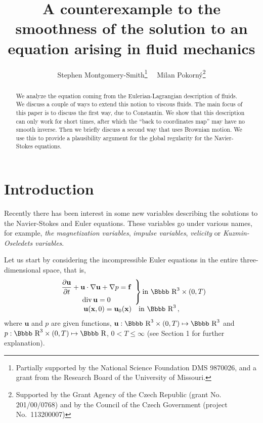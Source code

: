 \documentclass[12pt,twoside]{article}
\renewcommand {\div}{{\rm div}\,}
\newcommand {\rdd}{\mbox{\Bbbb R}}
\newcommand {\bu}{{\mathbf{u}}}
\newcommand {\bff}{{\mathbf{f}}}
\newcommand {\bx}{{\mathbf{x}}}
\newcommand {\pder}[2]{\frac {\partial #1}{\partial #2}}
\begin{document}
\title{A counterexample to the smoothness of the solution to an equation
arising in fluid mechanics 
}

\author {Stephen Montgomery-Smith\thanks{Partially supported by 
the National Science Foundation DMS 9870026, and a grant from the
Research Board of the University of Missouri.}
 \ \ Milan Pokorn\'y\thanks{Supported by the Grant Agency of the 
Czech Republic (grant
No. 201/00/0768) and by the Council of the Czech Government
(project No.~113200007)}
\date{}
}
\maketitle

\begin{abstract}
We analyze the equation coming from the Eulerian-Lagrangian description
of fluids.  We discuss a couple of ways to extend this notion to 
viscous fluids.  The main focus of this paper is to discuss 
the first way, due to Constantin.  We show that this description
can only work for short times, after which the ``back to coordinates map''
may have no smooth inverse.  Then we briefly discuss a second way that
uses Brownian motion.  We use this to provide a plausibility argument
for the global regularity for the Navier-Stokes equations.
\end{abstract}

\section{Introduction}

Recently there has been interest in some new variables describing 
the solutions to the Navier-Stokes and Euler equations.  These variables
go under various names, for example, {\em the magnetization variables},
{\em 
impulse variables}, {\em velicity} or {\em Kuzmin-Oseledets variables}.


Let us start by considering the incompressible Euler equations in the entire 
three-dimensional space, that is,
\begin{equation} \label{euleru} %
\begin{array}{c}
\left. \begin{array}{c}
\displaystyle \pder{\bu}{t} + \bu\cdot \nabla \bu + \nabla p = \bff \\[6pt]
\div \bu = 0 
\end{array} \right\} {\rm in \ } \rdd^3 \times (0,T) \\[10pt]
\bu(\bx,0) = \bu_0(\bx) \quad {\rm in \ } \rdd^3\, ,
\end{array}
\end{equation}
where $\bu$ and $p$ are given functions, $\bu: \rdd^3 \times(0,T) 
\mapsto \rdd^3$ and $p: \rdd^3 \times(0,T) 
\mapsto \rdd$, $0<T\leq \infty$ (see Section 1 for further 
explanation).
\end{document}
